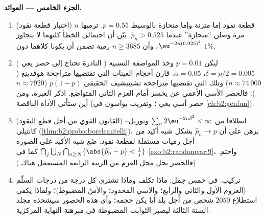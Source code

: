 \begin{problem}
\medskip
\noindent\textbf{الجزء الخامس --- العوائد.}
\begin{enumerate}[resume]
  \item (اختبار قطعة نقود) قطعة نقود إما متزنة وإما منحازة بالوسيط
        $p = 0.55$. ترميها $n$ مرة وتعلن ``منحازة'' عندما $\widehat p_n > 0.525$.
        بيّن أن احتمالي الخطأ كليهما لا يتجاوز $\eu^{-2n(0.025)^2}$، وأن $n \geq 3685$
        رمية تضمن أن يكونا كلاهما دون $1\%$.
  \item ( النادرة تحتاج إلى حصر يعي ) ليكن $p =
        0.01$
        وخذ المواصفة النسبية $\delta =
        p/2 = 0.005$، $\alpha = 0.05$. قارن أحجام العينات
        التي تقتضيها متراجحة هوفدينغ ($n \approx 74\,000$) وتلك التي تقتضيها
        متراجحة تشيبيشيف  الحقيقي $p(1-p)$ ($n
        \approx 7920$): فالحصر
        الأسي الأعمى عن  يخسر أمام العزم الثاني المتواضع.
        اذكر العبرة، ومن أين ستأتي الأداة الناقصة (حصر أسي يعي
        ؛ وتقريب بواسون في \cref{ch:b2:genfun}).
  \item (القانون القوي من أجل قطع النقود) انطلاقا من $\sum_n
        2\eu^{-2n\delta^2} < \infty$
        وبوريل--كانتيلي (\cref{thm:b2:proba:borelcantelli})، برهن على أن $\widehat p_n \to p$ بشكل شبه أكيد
        من أجل رميات مستقلة لقطعة نقود: صُغ  شبه الأكيد على
        الصورة $\bigcap_j\bigcup_N\bigcap_{n\geq N}
        \{\abs{\widehat p_n - p} < \tfrac1j\}$ كما في \cref{exo:b2:randomvar:9}، واختم. (فالحصر يحل محل العزم
        من الرتبة الرابعة المستعمل هناك.)
  \item تركيب. في خمس جمل: ماذا تكلف وماذا تشتري كل درجة من درجات
        السلّم (العزوم الأول والثاني والرابع؛ والأسي المحدود؛ والأسّ
        المضبوط)؛ ولماذا يكفي استطلاع $2050$ شخص من أجل بلد أيا يكن
        حجمه؛ وأي هذه الحصور سيشحذه مجلد السنة الثالثة ليصير الثوابت
        المضبوطة في مبرهنة النهاية المركزية.
\end{enumerate}
\end{problem}

